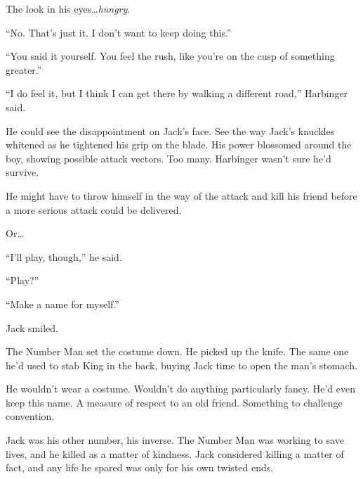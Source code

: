 The look in his eyes\ldots \emph{hungry}.



``No.  That's just it.  I don't want to keep doing this.''



``You said it yourself.  You feel the rush, like you're on the cusp of something greater.''



``I do feel it, but I think I can get there by walking a different road,'' Harbinger said.



He could see the disappointment on Jack's face.  See the way Jack's knuckles whitened as he tightened his grip on the blade.  His power blossomed around the boy, showing possible attack vectors.  Too many.  Harbinger wasn't sure he'd survive.



He might have to throw himself in the way of the attack and kill his friend before a more serious attack could be delivered.



Or\ldots



``I'll play, though,'' he said.



``Play?''



``Make a name for myself.''



Jack smiled.



\blacksquare






The Number Man set the costume down.  He picked up the knife.  The same one he'd used to stab King in the back, buying Jack time to open the man's stomach.



He wouldn't wear a costume.  Wouldn't do anything particularly fancy.  He'd even keep this name.  A measure of respect to an old friend.  Something to challenge convention.



Jack was his other number, his inverse.  The Number Man was working to save lives, and he killed as a matter of kindness.  Jack considered killing a matter of fact, and any life he spared was only for his own twisted ends.



